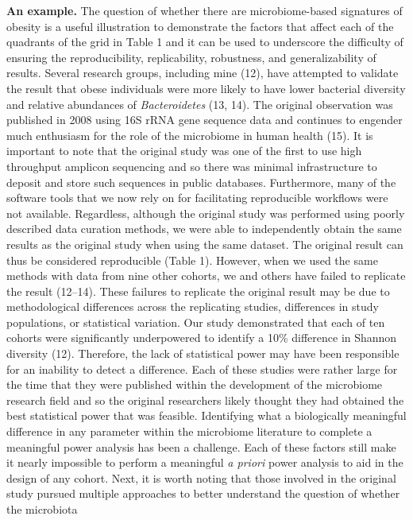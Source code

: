 \documentclass[]{article}
\begin{document}
\textbf{An example.} The question of whether there are microbiome-based
signatures of obesity is a useful illustration to demonstrate the
factors that affect each of the quadrants of the grid in Table 1 and it
can be used to underscore the difficulty of ensuring the
reproducibility, replicability, robustness, and generalizability of
results. Several research groups, including mine (12), have attempted to
validate the result that obese individuals were more likely to have
lower bacterial diversity and relative abundances of
\emph{Bacteroidetes} (13, 14). The original observation was published in
2008 using 16S rRNA gene sequence data and continues to engender much
enthusiasm for the role of the microbiome in human health (15). It is
important to note that the original study was one of the first to use
high throughput amplicon sequencing and so there was minimal
infrastructure to deposit and store such sequences in public databases.
Furthermore, many of the software tools that we now rely on for
facilitating reproducible workflows were not available. Regardless,
although the original study was performed using poorly described data
curation methods, we were able to independently obtain the same results
as the original study when using the same dataset. The original result
can thus be considered reproducible (Table 1). However, when we used the
same methods with data from nine other cohorts, we and others have
failed to replicate the result (12--14). These failures to replicate the
original result may be due to methodological differences across the
replicating studies, differences in study populations, or statistical
variation. Our study demonstrated that each of ten cohorts were
significantly underpowered to identify a 10\% difference in Shannon
diversity (12). Therefore, the lack of statistical power may have been
responsible for an inability to detect a difference. Each of these
studies were rather large for the time that they were published within
the development of the microbiome research field and so the original
researchers likely thought they had obtained the best statistical power
that was feasible. Identifying what a biologically meaningful difference
in any parameter within the microbiome literature to complete a
meaningful power analysis has been a challenge. Each of these factors
still make it nearly impossible to perform a meaningful \emph{a priori}
power analysis to aid in the design of any cohort. Next, it is worth
noting that those involved in the original study pursued multiple
approaches to better understand the question of whether the microbiota
\end{document}
